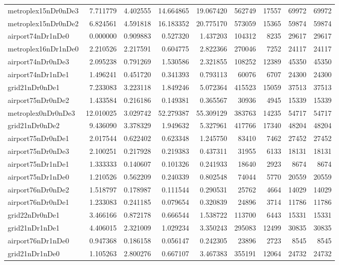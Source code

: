 \documentclass[../../../thesis.tex]{subfiles}
\begin{document}
\begin{longtable}{|l|r|r|r|r|r|r|r|r|}
metroplex15nDr0nDe3 & 7.711779 & 4.402555 & 14.664865 & 19.067420 & 562749 & 17557 & 69972 & 69972 \\
metroplex15nDr0nDe2 & 6.824561 & 4.591818 & 16.183352 & 20.775170 & 573059 & 15365 & 59874 & 59874 \\
airport74nDr1nDe0 & 0.000000 & 0.909883 & 0.527320 & 1.437203 & 104312 & 8235 & 29617 & 29617 \\
metroplex16nDr1nDe0 & 2.210526 & 2.217591 & 0.604775 & 2.822366 & 270046 & 7252 & 24117 & 24117 \\
airport74nDr0nDe3 & 2.095238 & 0.791269 & 1.530586 & 2.321855 & 108252 & 12389 & 45350 & 45350 \\
airport74nDr1nDe1 & 1.496241 & 0.451720 & 0.341393 & 0.793113 & 60076 & 6707 & 24300 & 24300 \\
grid21nDr0nDe1 & 7.233083 & 3.223118 & 1.849246 & 5.072364 & 415523 & 15059 & 37513 & 37513 \\
airport75nDr0nDe2 & 1.433584 & 0.216186 & 0.149381 & 0.365567 & 30936 & 4945 & 15339 & 15339 \\
metroplex0nDr0nDe3 & 12.010025 & 3.029742 & 52.279387 & 55.309129 & 383763 & 14235 & 54717 & 54717 \\
grid21nDr0nDe2 & 9.436090 & 3.378329 & 1.949632 & 5.327961 & 417766 & 17340 & 48204 & 48204 \\
airport75nDr0nDe1 & 2.017544 & 0.622402 & 0.623348 & 1.245750 & 83410 & 7462 & 27452 & 27452 \\
airport75nDr0nDe3 & 2.100251 & 0.217928 & 0.219383 & 0.437311 & 31955 & 6133 & 18131 & 18131 \\
airport75nDr1nDe1 & 1.333333 & 0.140607 & 0.101326 & 0.241933 & 18640 & 2923 & 8674 & 8674 \\
airport75nDr1nDe0 & 1.210526 & 0.562209 & 0.240339 & 0.802548 & 74044 & 5770 & 20559 & 20559 \\
airport76nDr0nDe2 & 1.518797 & 0.178987 & 0.111544 & 0.290531 & 25762 & 4664 & 14029 & 14029 \\
airport76nDr0nDe1 & 1.233083 & 0.241185 & 0.079654 & 0.320839 & 24896 & 3714 & 11786 & 11786 \\
grid22nDr0nDe1 & 3.466166 & 0.872178 & 0.666544 & 1.538722 & 113700 & 6443 & 15331 & 15331 \\
grid21nDr1nDe1 & 4.406015 & 2.321009 & 1.029234 & 3.350243 & 295083 & 12499 & 30835 & 30835 \\
airport76nDr1nDe0 & 0.947368 & 0.186158 & 0.056147 & 0.242305 & 23896 & 2723 & 8545 & 8545 \\
grid21nDr1nDe0 & 1.105263 & 2.800276 & 0.667107 & 3.467383 & 355191 & 12064 & 24732 & 24732 \\

\end{longtable}
\end{document}
